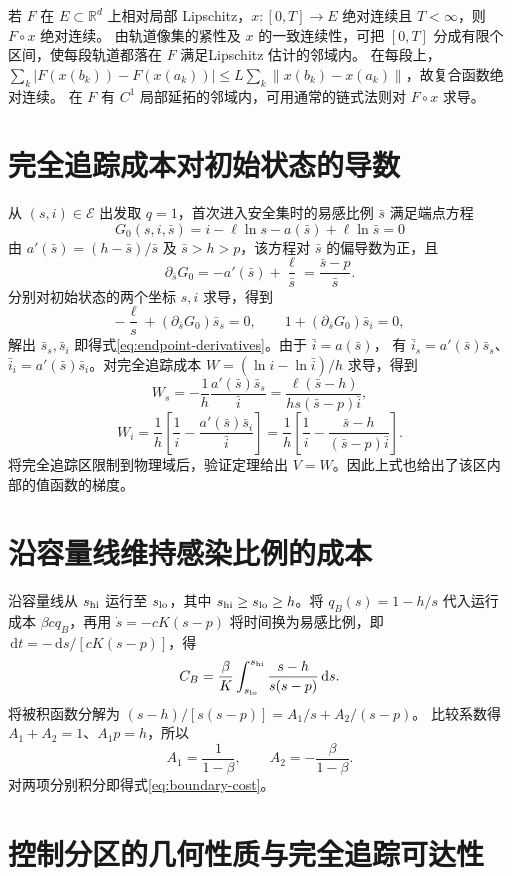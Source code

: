 \documentclass[lang=cn,a4paper,newtx]{elegantpaper}
\theoremstyle{plain}
\theoremstyle{definition}
\newcommand{\R}{\mathbb R}
\newcommand{\dd}{\,\mathrm d}
\begin{document}
若 $F$ 在 $E\subset\R^d$ 上相对局部 Lipschitz，$x:[0,T]\to E$ 绝对连续且 $T<\infty$，则 $F\circ x$ 绝对连续\parencite[\S262B(b)、\S262X(l)]{Fremlin2001Volume2}。
由轨道像集的紧性及 $x$ 的一致连续性，可把 $[0,T]$ 分成有限个区间，使每段轨道都落在 $F$ 满足Lipschitz 估计的邻域内。
在每段上，$\sum_k|F(x(b_k))-F(x(a_k))|\le L\sum_k\|x(b_k)-x(a_k)\|$，故复合函数绝对连续。
在 $F$ 有 $C^1$ 局部延拓的邻域内，可用通常的链式法则对 $F\circ x$ 求导。



\section{完全追踪成本对初始状态的导数}
\label{app:W-derivatives}
从 $(s,i)\in\mathcal E$ 出发取 $q=1$，首次进入安全集时的易感比例 $\bar s$ 满足端点方程
\[
G_0(s,i,\bar s)=i-\ell\ln s-a(\bar s)+\ell\ln\bar s=0
\]
由 $a'(\bar s)=(h-\bar s)/\bar s$ 及 $\bar s>h>p$，该方程对 $\bar s$ 的偏导数为正，且
\[
\partial_{\bar s}G_0=-a'(\bar s)+\frac\ell{\bar s}
=\frac{\bar s-p}{\bar s}.
\]
分别对初始状态的两个坐标 $s,i$ 求导，得到
\[
-\frac\ell s+(\partial_{\bar s}G_0)\bar s_s=0,\qquad
1+(\partial_{\bar s}G_0)\bar s_i=0,
\]
解出 $\bar s_s,\bar s_i$ 即得式\eqref{eq:endpoint-derivatives}。由于 $\bar i=a(\bar s)$，
有 $\bar i_s=a'(\bar s)\bar s_s$、$\bar i_i=a'(\bar s)\bar s_i$。对完全追踪成本 $W=(\ln i-\ln\bar i)/h$ 求导，得到
\[
W_s=-\frac1h\frac{a'(\bar s)\bar s_s}{\bar i}
=\frac{\ell(\bar s-h)}{hs(\bar s-p)\bar i},
\]
\[
W_i=\frac1h\left[\frac1i-\frac{a'(\bar s)\bar s_i}{\bar i}\right]
=\frac1h\left[\frac1i-\frac{\bar s-h}{(\bar s-p)\bar i}\right].
\]
将完全追踪区限制到物理域后，验证定理给出 $V=W$。因此上式也给出了该区内部的值函数的梯度。

\section{沿容量线维持感染比例的成本}
\label{app:capacity-integral}
沿容量线从 $s_{\rm hi}$ 运行至 $s_{\rm lo}$，其中 $s_{\rm hi}\ge s_{\rm lo}\ge h$。将 $q_B(s)=1-h/s$ 代入运行成本 $\beta c q_B$，再用 $\dot s=-cK(s-p)$ 将时间换为易感比例，即 $\dd t=-\dd s/[cK(s-p)]$，得
\[
C_B=\frac \beta K\int_{s_{\rm lo}}^{s_{\rm hi}}\frac{s-h}{s(s-p)}\dd s.
\]
将被积函数分解为 $(s-h)/[s(s-p)]=A_1/s+A_2/(s-p)$。
比较系数得 $A_1+A_2=1$、$A_1p=h$，所以
\[
A_1=\frac1{1-\beta},\qquad A_2=-\frac \beta{1-\beta}.
\]
对两项分别积分即得式\eqref{eq:boundary-cost}。

\section{控制分区的几何性质与完全追踪可达性}
\label{app:tracking-region-proof}
\end{document}
